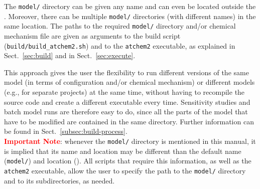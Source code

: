 The \texttt{model/} directory can be given any name and can even be
located outside the \maindir. Moreover, there can be multiple
\texttt{model/} directories (with different names) in the same
location. The paths to the required \texttt{model/} directory and/or
chemical mechanism file are given as arguments to the build script
(\texttt{build/build\_atchem2.sh}) and to the \texttt{atchem2}
executable, as explained in Sect.~\ref{sec:build} and in
Sect.~\ref{sec:execute}.

This approach gives the user the flexibility to run different versions
of the same model (in terms of configuration and/or chemical
mechanism) or different models (e.g., for separate projects) at the
same time, without having to recompile the source code and create a
different executable every time. Sensitivity studies and batch model
runs are therefore easy to do, since all the parts of the model that
have to be modified are contained in the same directory. Further
information can be found in Sect.~\ref{subsec:build-process}.\\

\textcolor{red}{\bf Important Note}: whenever the \texttt{model/}
directory is mentioned in this manual, it is implied that its name and
location may be different than the default name (\texttt{model/}) and
location (\maindir). All scripts that require this information, as
well as the \texttt{atchem2} executable, allow the user to specify the
path to the \texttt{model/} directory and to its subdirectories, as
needed.

